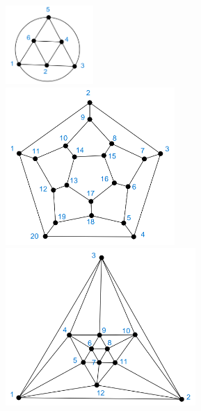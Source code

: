\documentclass[12pt]{article}
\begin{document}
\begin{enumerate}
\begin{enumerate}
\begin{center}
                              \hfill
                              \includegraphics[height=3cm]{img/hw2/hamil3}
                              \hfill \mbox{} \\
                              \hfill
                              \includegraphics[height=6cm]{img/hw2/hamil4}
                              \hfill
                              \includegraphics[height=6cm]{img/hw2/hamil5}
                              \hfill \mbox{}
                        \end{center}

                        \pagebreak


\end{enumerate}
\end{enumerate}
\end{document}
